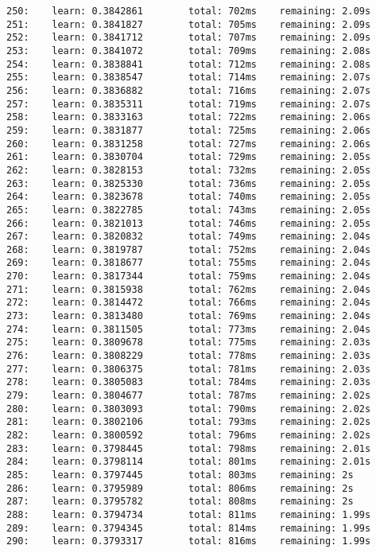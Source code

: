 \documentclass[11pt]{article}
\begin{document}
\begin{Verbatim}[commandchars=\\\{\}]
250:    learn: 0.3842861        total: 702ms    remaining: 2.09s
251:    learn: 0.3841827        total: 705ms    remaining: 2.09s
252:    learn: 0.3841712        total: 707ms    remaining: 2.09s
253:    learn: 0.3841072        total: 709ms    remaining: 2.08s
254:    learn: 0.3838841        total: 712ms    remaining: 2.08s
255:    learn: 0.3838547        total: 714ms    remaining: 2.07s
256:    learn: 0.3836882        total: 716ms    remaining: 2.07s
257:    learn: 0.3835311        total: 719ms    remaining: 2.07s
258:    learn: 0.3833163        total: 722ms    remaining: 2.06s
259:    learn: 0.3831877        total: 725ms    remaining: 2.06s
260:    learn: 0.3831258        total: 727ms    remaining: 2.06s
261:    learn: 0.3830704        total: 729ms    remaining: 2.05s
262:    learn: 0.3828153        total: 732ms    remaining: 2.05s
263:    learn: 0.3825330        total: 736ms    remaining: 2.05s
264:    learn: 0.3823678        total: 740ms    remaining: 2.05s
265:    learn: 0.3822785        total: 743ms    remaining: 2.05s
266:    learn: 0.3821013        total: 746ms    remaining: 2.05s
267:    learn: 0.3820832        total: 749ms    remaining: 2.04s
268:    learn: 0.3819787        total: 752ms    remaining: 2.04s
269:    learn: 0.3818677        total: 755ms    remaining: 2.04s
270:    learn: 0.3817344        total: 759ms    remaining: 2.04s
271:    learn: 0.3815938        total: 762ms    remaining: 2.04s
272:    learn: 0.3814472        total: 766ms    remaining: 2.04s
273:    learn: 0.3813480        total: 769ms    remaining: 2.04s
274:    learn: 0.3811505        total: 773ms    remaining: 2.04s
275:    learn: 0.3809678        total: 775ms    remaining: 2.03s
276:    learn: 0.3808229        total: 778ms    remaining: 2.03s
277:    learn: 0.3806375        total: 781ms    remaining: 2.03s
278:    learn: 0.3805083        total: 784ms    remaining: 2.03s
279:    learn: 0.3804677        total: 787ms    remaining: 2.02s
280:    learn: 0.3803093        total: 790ms    remaining: 2.02s
281:    learn: 0.3802106        total: 793ms    remaining: 2.02s
282:    learn: 0.3800592        total: 796ms    remaining: 2.02s
283:    learn: 0.3798445        total: 798ms    remaining: 2.01s
284:    learn: 0.3798114        total: 801ms    remaining: 2.01s
285:    learn: 0.3797445        total: 803ms    remaining: 2s
286:    learn: 0.3795989        total: 806ms    remaining: 2s
287:    learn: 0.3795782        total: 808ms    remaining: 2s
288:    learn: 0.3794734        total: 811ms    remaining: 1.99s
289:    learn: 0.3794345        total: 814ms    remaining: 1.99s
290:    learn: 0.3793317        total: 816ms    remaining: 1.99s

\end{Verbatim}
\end{document}
